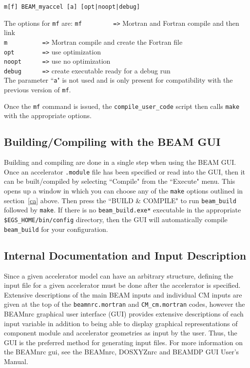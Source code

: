 \documentclass[12pt,twoside]{article}
\begin{document}
\begin{verbatim}
m[f] BEAM_myaccel [a] [opt|noopt|debug]
\end{verbatim}
The options for {\tt mf} are:
\verb+mf         =>+ Mortran and Fortran compile and then link\\
\verb+m          =>+ Mortran compile and create the Fortran file\\
\verb+opt        =>+ use optimization\\
\verb+noopt      =>+ use no optimization\\
\verb+debug      =>+ create executable ready for a debug run\\
The parameter ``{\tt a}" is not used and is only present for compatibility
with the previous version of {\tt mf}.

Once the {\tt mf} command is issued, the {\tt compile\_user\_code}
script then calls {\tt make} with the appropriate options.

\subsection{Building/Compiling with the BEAM GUI}
Building and compiling are done in a single step when using the BEAM GUI.
Once an accelerator {\tt .module} file has been specified or read into
the GUI, then it can be built/compiled by selecting ``Compile" from
the ``Execute" menu.  This opens up a window in which you can choose any
of the {\tt make} options outlined in section~\ref{ca} above.  Then
press the ``BUILD \& COMPILE" to run {\tt beam\_build} followed by
{\tt make}.  If there
is no {\tt beam\_build.exe*} executable in the appropriate
{\tt \$EGS\_HOME/bin/config} directory, then the GUI will automatically
compile {\tt beam\_build} for your configuration.

\subsection[Internal Documentation \& Input Description]{Internal Documentation and Input Description}

Since a given accelerator model can have an arbitrary structure,
defining the input file for a given accelerator must be done after the
accelerator is specified.
Extensive descriptions of the main BEAM inputs and individual CM inputs
are given at the top of the {\tt beamnrc.mortran} and {\tt CM\_cm.mortran}
codes, however the BEAMnrc graphical user interface (GUI) provides
extensive descriptions of each input variable in addition
to being able to display graphical representations of component module and
accelerator geometries as input by the user.
Thus, the GUI is the preferred method for generating
input files.  For more information on the BEAMnrc gui, see the BEAMnrc,
DOSXYZnrc and
BEAMDP GUI User's Manual\cite{TR99}.
 
\end{document}
